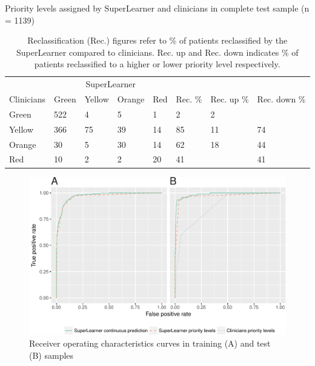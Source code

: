 \documentclass[10pt,letterpaper]{article}\usepackage[]{graphicx}\usepackage[]{color}
\begin{document}
\begin{table}[ht]
\centering
\caption{Priority levels assigned by SuperLearner and clinicians in complete test sample (n = 1139)} 
\label{tab:reclass_all}
\begin{tabular}{llllllll}
  \hline
  & \multicolumn{4}{c}{SuperLearner} \\
 Clinicians & Green & Yellow & Orange & Red & Rec. \% & Rec. up \% & Rec. down \% \\
 \hline
Green & 522 & 4 & 5 & 1 & 2 & 2 &  \\ 
  Yellow & 366 & 75 & 39 & 14 & 85 & 11 & 74 \\ 
  Orange & 30 & 5 & 30 & 14 & 62 & 18 & 44 \\ 
  Red & 10 & 2 & 2 & 20 & 41 &  & 41 \\ 
   \hline
\end{tabular}
\caption*{Reclassification (Rec.) figures refer to \% of patients reclassified by the SuperLearner compared to clinicians. Rec. up and Rec. down indicates \% of patients reclassified to a higher or lower priority level respectively.} 
\end{table}


\begin{figure}
  \caption{Receiver operating characteristics curves in training (A) and test
    (B) samples}
  \label{fig:roc_plot}
  \includegraphics[width=\textwidth]{roc_plot.pdf}
\end{figure}
\end{document}
